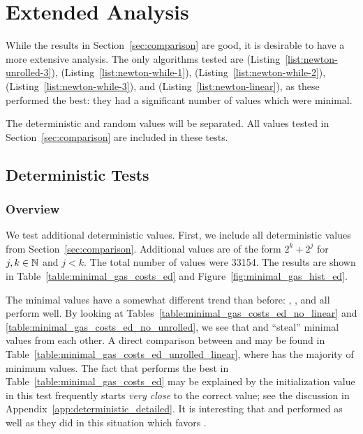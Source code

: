 \section{Extended Analysis}
\label{app:extended}

While the results in Section~\ref{sec:comparison} are good,
it is desirable to have a more extensive analysis.
The only algorithms tested are
\UnrolledThree{} (Listing~\ref{list:newton-unrolled-3}),
\WhileOne{} (Listing~\ref{list:newton-while-1}),
\WhileTwo{} (Listing~\ref{list:newton-while-2}),
\WhileThree{} (Listing~\ref{list:newton-while-3}), and
\Linear{} (Listing~\ref{list:newton-linear}),
as these performed the best:
they had a significant number of values which were minimal.

The deterministic and random values will be separated.
All values tested in Section~\ref{sec:comparison}
are included in these tests.

\subsection{Deterministic Tests}
\label{app:deterministic}

\subsubsection{Overview}

We test additional deterministic values.
First, we include all deterministic values from Section~\ref{sec:comparison}.
Additional values are of the form $2^{k} + 2^{j}$ for $j,k\in\mathbb{N}$ and $j < k$.
The total number of values were 33154.
The results are shown in Table~\ref{table:minimal_gas_costs_ed}
and Figure~\ref{fig:minimal_gas_hist_ed}.

The minimal values have a somewhat different trend than before:
\UnrolledThree{}, \Linear{}, and \WhileOne{} all perform well.
By looking at Tables~\ref{table:minimal_gas_costs_ed_no_linear} and
\ref{table:minimal_gas_costs_ed_no_unrolled},
we see that \UnrolledThree{} and \Linear{} ``steal''
minimal values from each other.
A direct comparison between \UnrolledThree{} and \Linear{}
may be found in Table~\ref{table:minimal_gas_costs_ed_unrolled_linear},
where \UnrolledThree{} has the majority of minimum values.
The fact that \WhileOne{} performs the best in
Table~\ref{table:minimal_gas_costs_ed}
may be explained by the initialization value in this test
frequently starts \emph{very close} to the correct value;
see the discussion in Appendix~\ref{app:deterministic_detailed}.
It is interesting that \UnrolledThree{} and \Linear{} performed
as well as they did in this situation which favors \WhileOne{}.

